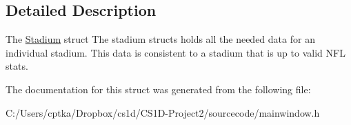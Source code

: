 \subsection{Detailed Description}
The \mbox{\hyperlink{struct_stadium}{Stadium}} struct The stadium structs holds all the needed data for an individual stadium. This data is consistent to a stadium that is up to valid N\+FL stats. 

The documentation for this struct was generated from the following file\+:\begin{DoxyCompactItemize}
\item 
C\+:/\+Users/cptka/\+Dropbox/cs1d/\+C\+S1\+D-\/\+Project2/sourcecode/mainwindow.\+h\end{DoxyCompactItemize}
